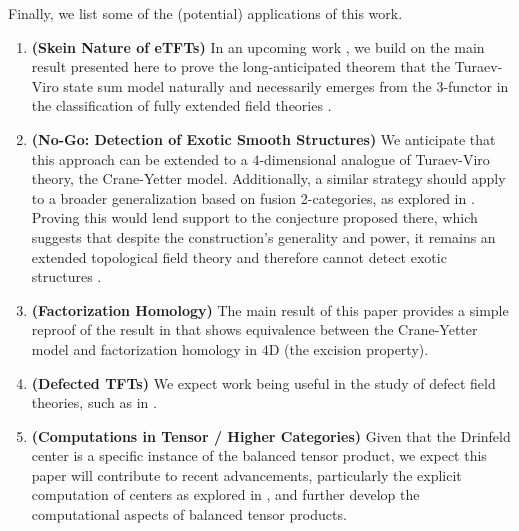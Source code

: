\noindent Finally, we list some of the (potential) applications of this work.

\begin{enumerate}
  \item \textbf{(Skein Nature of eTFTs)} In an upcoming work
        \cite{guu/tv-as-3-functor}, we build on the main result presented here
        to prove the long-anticipated theorem that the Turaev-Viro state sum
        model \cite{viro/turaev-viro-model} naturally and necessarily emerges
        from the 3-functor in the classification of fully extended field
        theories \cite{lurie/tqft} \cite{douglas/dualizable-tensor-categories}.
  \item \textbf{(No-Go: Detection of Exotic Smooth Structures)} We anticipate
        that this approach can be extended to a $4$-dimensional analogue of Turaev-Viro theory, the
        Crane-Yetter model. Additionally, a similar strategy should apply to a
        broader generalization based on fusion 2-categories, as explored in
        \cite{douglas/fusion-2-cat-4d-tqft}. Proving this would lend support
        to the conjecture proposed there, which suggests that despite the
        construction's generality and power, it remains an extended
        topological field theory and therefore cannot detect exotic structures
        \cite{reutter/no-go-exotic}.
  \item \textbf{(Factorization Homology)} The main result of this paper
        provides a simple reproof of the result in
        \cite{kirillov/fact-homo-4d-tqft} that shows equivalence between the
        Crane-Yetter model and factorization homology
        \cite{ayala/factorization-homology} in $4$D (the excision property).
  \item \textbf{(Defected TFTs)} We expect work being useful in the study of
        defect field theories, such as in \cite{meusburger/defect-tv}.
  \item \textbf{(Computations in Tensor / Higher Categories)} Given that the
        Drinfeld center is a specific instance of the balanced tensor product,
        we expect this paper will contribute to recent advancements,
        particularly the explicit computation of centers as explored in
        \cite{maurer/computing-center}, and further develop the computational
        aspects of balanced tensor products.
\end{enumerate}



